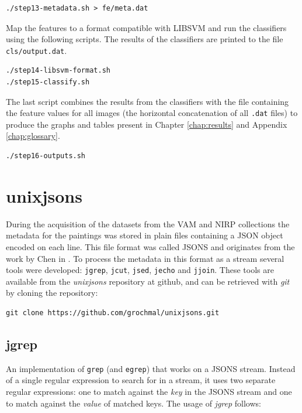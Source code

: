 \documentclass[11pt,a4paper,twoside,openright]{report}
\begin{document}
\begin{Verbatim}[frame=leftline]
./step13-metadata.sh > fe/meta.dat
\end{Verbatim}

Map the features to a format compatible with LIBSVM and run the classifiers
using the following scripts.  The results of the classifiers are printed to the
file \texttt{cls/output.dat}.

\begin{Verbatim}[frame=leftline]
./step14-libsvm-format.sh
./step15-classify.sh
\end{Verbatim}

The last script combines the results from the classifiers with the file
containing the feature values for all images (the horizontal concatenation of
all \texttt{.dat} files) to produce the graphs and tables present in Chapter
\ref{chap:results} and Appendix \ref{chap:glossary}.

\begin{Verbatim}[frame=leftline]
./step16-outputs.sh
\end{Verbatim}

\clearpage{\pagestyle{empty}\cleardoublepage}
\chapter{unixjsons}
\label{chap:unixjsons}

During the acquisition of the datasets from the VAM and NIRP collections the
metadata for the paintings was stored in plain files containing a JSON object
encoded on each line.  This file format was called JSONS and originates from
the work by Chen in \cite{chen09yahoo}.  To process the metadata in this format
as a stream several tools were developed: \texttt{jgrep}, \texttt{jcut},
\texttt{jsed}, \texttt{jecho} and \texttt{jjoin}.  These tools are available
from the \emph{unixjsons} repository at github, and can be retrieved with
\emph{git} by cloning the repository:

\begin{verbatim}
git clone https://github.com/grochmal/unixjsons.git
\end{verbatim}

\section{jgrep}

An implementation of \texttt{grep} (and \texttt{egrep}) that works on a JSONS
stream.  Instead of a single regular expression to search for in a stream, it
uses two separate regular expressions: one to match against the \emph{key} in
the JSONS stream and one to match against the \emph{value} of matched keys.
The usage of \emph{jgrep} follows:
\end{document}
